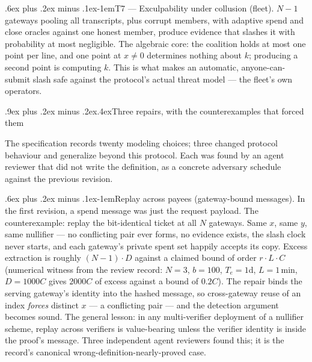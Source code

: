 \documentclass[9pt]{extarticle}
\makeatletter
\renewcommand\subsection{\@startsection{subsection}{2}{0pt}%
  {.9ex plus .2ex minus .2ex}{.4ex}{\normalfont\large\bfseries}}
\renewcommand\paragraph{\@startsection{paragraph}{4}{0pt}%
  {.6ex plus .2ex minus .1ex}{-1em}{\normalfont\normalsize\bfseries}}
\makeatother
\begin{document}
\paragraph{T7 --- Exculpability under collusion (fleet).} $N-1$ gateways
pooling all transcripts, plus corrupt members, with adaptive spend and
close oracles against one honest member, produce evidence that slashes it
with probability at most negligible. The algebraic core: the coalition
holds at most one point per line, and one point at $x \neq 0$ determines
nothing about $k$; producing a second point is computing $k$. This is what
makes an automatic, anyone-can-submit slash safe against the protocol's
actual threat model --- the fleet's own operators.

\subsection{Three repairs, with the counterexamples that forced
them}\label{sec:repairs}

The specification records twenty modeling choices; three changed protocol
behaviour and generalize beyond this protocol. Each was found by an agent
reviewer that did not write the definition, as a concrete adversary
schedule against the previous revision.

\paragraph{Replay across payees (gateway-bound messages).} In the first
revision, a spend message was just the request payload. The
counterexample: replay the bit-identical ticket at all $N$ gateways. Same
$x$, same $y$, same nullifier --- no conflicting pair ever forms, no
evidence exists, the slash clock never starts, and each gateway's private
spent set happily accepts its copy. Excess extraction is roughly
$(N-1) \cdot D$ against a claimed bound of order $r \cdot L \cdot C$
(numerical witness from the review record: $N{=}3$, $b{=}100$,
$T_e{=}1$d, $L{=}1$\,min, $D{=}1000C$ gives $2000C$ of excess against a
bound of $0.2C$). The repair binds the serving gateway's identity into the
hashed message, so cross-gateway reuse of an index \emph{forces} distinct
$x$ --- a conflicting pair --- and the detection argument becomes sound.
The general lesson: in any multi-verifier deployment of a nullifier
scheme, replay across verifiers is value-bearing unless the verifier
identity is inside the proof's message. Three independent agent reviewers found
this; it is the record's canonical wrong-definition-nearly-proved case.
\end{document}
